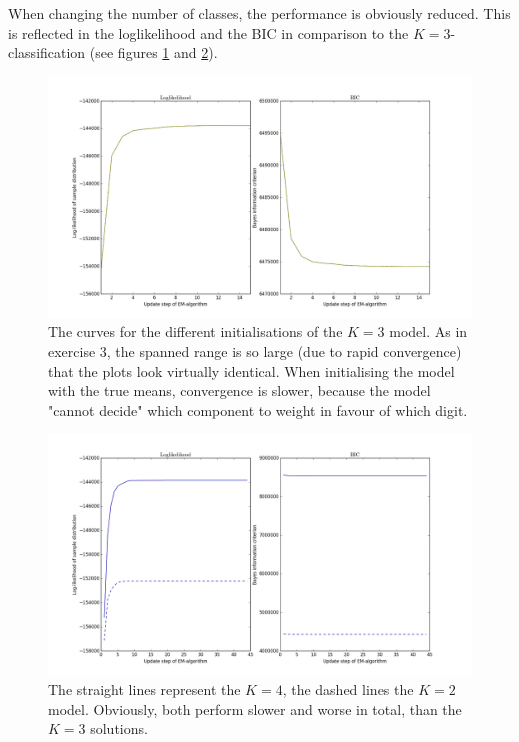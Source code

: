 When changing the number of classes, the performance is obviously reduced. This is reflected in the loglikelihood and the BIC in comparison to the $K=3$-classification (see figures \ref{fig4:3llh3} and \ref{fig4:3llh24}).
\begin{figure}[H]
	\centering \includegraphics{../Figures/Ex43_llh3.png}
	\caption{The curves for the different initialisations of the $K=3$ model. As in exercise 3, the spanned range is so large (due to rapid convergence) that the plots look virtually identical. When initialising the model with the true means, convergence is slower, because the model "cannot decide" which component to weight in favour of which digit.
	}
	\label{fig4:3llh3}
\end{figure}
\begin{figure}[H]
	\centering \includegraphics{../Figures/Ex43_llh24.png}
	\caption{The straight lines represent the $K=4$, the dashed lines the $K=2$ model. Obviously, both perform slower and worse in total, than the $K=3$ solutions.}
	\label{fig4:3llh24}
\end{figure}

